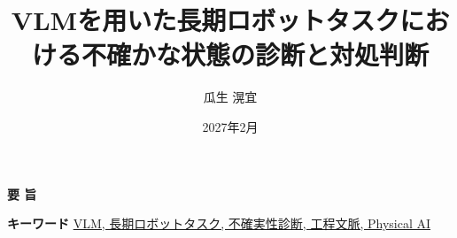 \documentclass{my_bthesis}
\title{VLMを用いた長期ロボットタスクにおける不確かな状態の診断と対処判断}
\author{瓜生 滉宜}
\date{2027年2月}
\begin{document}
\maketitle

\startabstractpage
{}

\begin{center}
  {\Large \textbf{要 \quad 旨}}
\end{center}



\vspace*{1mm}
\begin{center}
\noindent \textbf{キーワード} \underline{VLM, 長期ロボットタスク, 不確実性診断, 工程文脈, Physical AI}
\end{center}

\newpage

\tableofcontents
\clearpage

\listoffigures
\clearpage

\listoftables
\clearpage

\startmaintext
{}










\appendix




\end{document}
